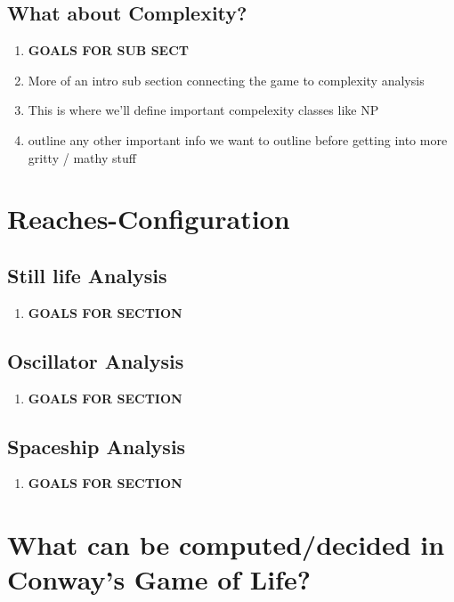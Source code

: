 \documentclass{article}
\theoremstyle{definition}
\theoremstyle{plain}
\theoremstyle{plain}
\begin{document}
\subsection{What about Complexity?}
\begin{enumerate}
  \item[] \textbf{GOALS FOR SUB SECT}
  \item More of an intro sub section connecting the game to complexity analysis  
  \item This is where we'll define important compelexity classes like NP
  \item outline any other important info we want to outline before getting into more gritty / mathy stuff

\end{enumerate}

\section{Reaches-Configuration}

\subsection{Still life Analysis}
\begin{enumerate}
  \item[] \textbf{GOALS FOR SECTION}
\end{enumerate}

\subsection{Oscillator Analysis}
\begin{enumerate}
  \item[] \textbf{GOALS FOR SECTION}
\end{enumerate}

\subsection{Spaceship Analysis}
\begin{enumerate}
  \item[] \textbf{GOALS FOR SECTION}
\end{enumerate}

\section{What can be computed/decided in Conway’s Game of Life?}
\end{document}
